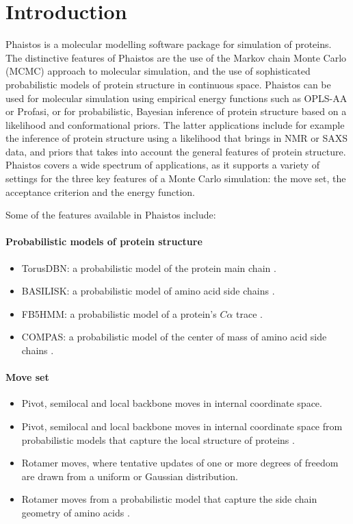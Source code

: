\documentclass[11pt,a4paper,twoside]{book}
\begin{document}
\newpage

\tableofcontents

\newpage

\chapter{Introduction}
\label{cha:introduction}
Phaistos is a molecular modelling software package for 
simulation of proteins. The distinctive features of Phaistos 
are the use of the Markov chain Monte Carlo (MCMC) approach to 
molecular simulation, and the use of sophisticated probabilistic models
of protein structure in continuous space. Phaistos 
can be used for molecular simulation using
empirical energy functions such as OPLS-AA or Profasi, or 
for probabilistic, Bayesian inference of protein structure based on
a likelihood and conformational priors. The latter applications 
include for example the inference of protein structure using a
likelihood that brings in NMR or SAXS data, and priors that 
takes into account the general features of protein structure. 
Phaistos covers a wide spectrum of applications, as it supports 
a variety of settings for the three key features of a Monte Carlo 
simulation: the move set, the acceptance criterion and the energy function. 

Some of the features available in Phaistos include:

\subsubsection*{Probabilistic models of protein structure}
\begin{itemize}
\item TorusDBN: a probabilistic model of the protein main chain \cite{boomsma2008gpm}.
\item BASILISK: a probabilistic model of amino acid side chains \cite{harder2010beyond}.
\item FB5HMM: a probabilistic model of a protein's $C\alpha$ trace \cite{hamelryck2006srp}.
\item COMPAS: a probabilistic model of the center of mass of amino acid side chains \cite{stovgaard2011}.
\end{itemize}
\subsubsection*{Move set}
\begin{itemize}
\item  Pivot, semilocal and local backbone moves in internal coordinate space.
\item  Pivot, semilocal and local backbone moves in internal coordinate space from probabilistic models that capture the local structure of proteins \cite{boomsma2008gpm}. 
\item  Rotamer moves, where tentative updates of one or more degrees of freedom are drawn from a uniform or Gaussian distribution.
\item  Rotamer moves from a probabilistic model that capture the side chain geometry of amino acids \cite{harder2010beyond}.
\end{itemize}
\end{document}
